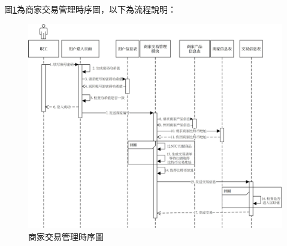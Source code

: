 圖\ref{time4}為商家交易管理時序圖，以下為流程說明：

	\begin{figure}[htbp]
		\centering
		\includegraphics[width = 1\textwidth]{time4.jpg}
		\caption{商家交易管理時序圖}\label{time4}
	\end{figure}

